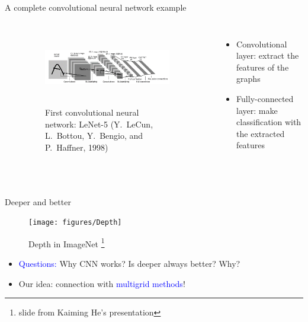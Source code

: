 \documentclass{beamer}
\newcommand{\blue}[1]{\textcolor{blue}{#1}}
\begin{document}
\begin{CJK*}{UTF8}{gbsn}
\begin{frame}{A complete convolutional neural network example}
\begin{columns}
\begin{figure}
\begin{center} 
\includegraphics[width=\linewidth]{figures/CNN2}  
\caption{First convolutional neural network: LeNet-5 (Y. LeCun, L. Bottou, Y. Bengio, and P. Haffner, 1998)}
\end{center}
\end{figure} 
\begin{itemize}
\item Convolutional layer: extract the features of the graphs 
\item Fully-connected layer: make classification with the extracted features
\end{itemize}
\end{columns}  
\end{frame}


\begin{frame}{Deeper and better}
\begin{figure}
\begin{center}
\texttt{[image: figures/Depth]}
\end{center}
\caption{Depth in ImageNet \footnote{slide from Kaiming He's presentation}}
\end{figure}
\begin{itemize}
\item  { \blue{Questions:} Why CNN works? Is deeper always better? Why?}
\item Our idea: connection with \blue{multigrid methods}!
\end{itemize}
\end{frame}


\end{CJK*}
\end{document}
